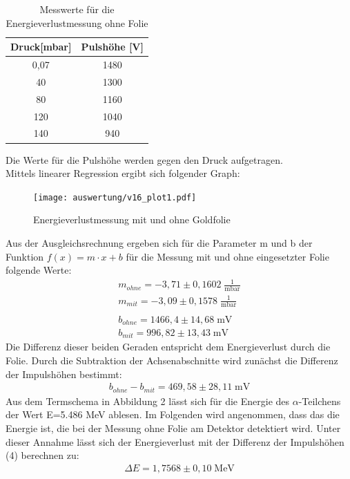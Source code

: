 \begin{table}[H] 
	\centering
	\begin{tabular}{c|c}

	Druck[mbar] & Pulshöhe  [V] \\ 
		\hline 
0,07	& 1480\\
40	& 1300\\
80	& 1160\\
120	& 1040\\
140	& 940\\
	
	\end{tabular} 
	\caption{Messwerte für die Energieverlustmessung ohne Folie } 
\end{table} 

Die Werte für die Pulshöhe werden gegen den Druck aufgetragen. \\ Mittels linearer Regression ergibt sich folgender Graph:   
\begin{figure}[h]
	\centering
	\texttt{[image: auswertung/v16\_plot1.pdf]}
	\caption{Energieverlustmessung mit und ohne Goldfolie}
	\label{img:grafik-dummy}
\end{figure}
\newpage 
Aus der Ausgleichsrechnung ergeben sich für die Parameter m und b der Funktion $f(x)=m\cdot x+b$ für die Messung mit und ohne eingesetzter Folie folgende Werte: 
\begin{align*}
m_{ohne}= -3,71 \pm 0,1602 \; \frac{1}{\text{mbar}}
\\
m_{mit}= -3,09 \pm 0,1578 \; \frac{1}{\text{mbar}}
\\
\\
b_{ohne}= 1466,4 \pm 14,68 \; \text{mV}
\\
b_{mit}= 996,82 \pm  13,43 \; \text{mV}
\end{align*}
Die Differenz dieser beiden Geraden entspricht dem Energieverlust durch die Folie. Durch die Subtraktion der Achsenabschnitte wird zunächst die Differenz der Impulshöhen bestimmt: 
\begin{align}
b_{ohne}-b_{mit}= 469,58 \pm 28,11 \; \text{mV}
\end{align} 
Aus dem Termschema in Abbildung 2 lässt sich für die Energie des $\alpha$-Teilchens der Wert E=5.486 MeV ablesen. Im Folgenden wird angenommen, dass das die Energie ist, die bei der Messung ohne Folie am Detektor detektiert wird. Unter dieser Annahme lässt sich der Energieverlust mit der Differenz der Impulshöhen (4) berechnen zu: 
\begin{align*}
\Delta E= 1,7568 \pm 0,10\;  \text{MeV}  
\end{align*} 

